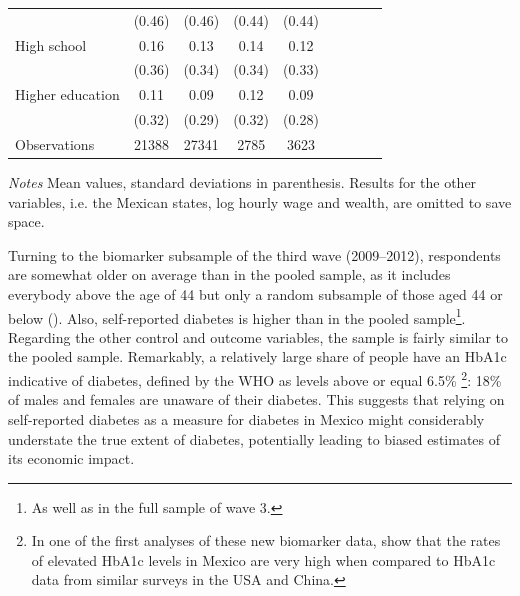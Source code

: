 \begin{table}[p]
\begin{adjustbox}{max width=\linewidth, center}
\begin{threeparttable}
{\begin{tabular}{l*{4}{SS}}
                    &      (0.46)&      (0.46)&      (0.44)&      (0.44)\\
High school         &        0.16&        0.13&        0.14&        0.12\\
                    &      (0.36)&      (0.34)&      (0.34)&      (0.33)\\
Higher education    &        0.11&        0.09&        0.12&        0.09\\
                    &      (0.32)&      (0.29)&      (0.32)&      (0.28)\\
\midrule
Observations        &    21388&       27341&        2785&        3623\\
\bottomrule
\end{tabular}
\begin{tablenotes}
\item \footnotesize \textit{Notes} Mean values, standard deviations in parenthesis. Results for the other variables, i.e. the Mexican states, log hourly wage and wealth, are omitted to save space.
\end{tablenotes}
}
\end{threeparttable}
\end{adjustbox}
\end{table}


Turning to the biomarker subsample of the third wave (2009--2012), respondents are somewhat older on average than in the pooled sample, as it includes everybody above the age of 44 but only a random subsample of those aged 44 or below (\cite{Crimmins2015}). Also, self-reported diabetes is higher than in the pooled sample\footnote{As well as in the full sample of wave 3.}. Regarding the other control and outcome variables, the sample is fairly similar to the pooled sample. Remarkably, a relatively large share of people have an \ac{HbA1c} indicative of diabetes, defined by the \ac{WHO} as levels above or equal 6.5\% \parencite{WorldHealthOrganization2011}\footnote{In one of the first analyses of these new biomarker data, \textcite{Frankenberg2015} show that the rates of elevated \ac{HbA1c} levels in Mexico are very high when compared to \ac{HbA1c} data from similar surveys in the USA and China.}: 18\% of males and females are unaware of their diabetes. This suggests that relying on self-reported diabetes as a measure for diabetes in Mexico might considerably understate the true extent of diabetes, potentially leading to biased estimates of its economic impact.


